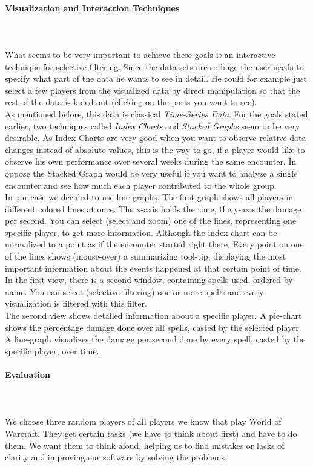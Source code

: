 \documentclass{scrartcl}
\begin{document}
\paragraph{Visualization and Interaction Techniques}
\hfill \\ \hfill \\
What seems to be very important to achieve these goals is an interactive technique for selective filtering. Since the data sets are so huge the user needs to specify what part of the data he wants to see in detail. He could for example just select a few players from the visualized data by direct manipulation so that the rest of the data is faded out (clicking on the parts you want to see).\\
As mentioned before, this data is classical \emph{Time-Series Data}. For the goals stated earlier, two techniques called \emph{Index Charts} and \emph{Stacked Graphs} seem to be very desirable. As Index Charts are very good when you want to observe relative data changes instead of absolute values, this is the way to go, if a player would like to observe his own performance over several weeks during the same encounter. In oppose the Stacked Graph would be very useful if you want to analyze a single encounter and see how much each player contributed to the whole group.\\
In our case we decided to use line graphs. The first graph shows all players in different colored lines at once. The x-axis holds the time, the y-axis the damage per second. You can select (select and zoom) one of the lines, representing one specific player, to get more information. Although the index-chart can be normalized to a point as if the encounter started right there. Every point on one of the lines shows (mouse-over) a summarizing tool-tip, displaying the most important information about the events happened at that certain point of time.\\
In the first view, there is a second window, containing spells used, ordered by name. You can select (selective filtering)  one or more spells and every visualization is filtered with this filter.\\
The second view shows detailed information about a specific player. A pie-chart shows the percentage damage done over all spells, casted by the selected player. A line-graph visualizes the damage per second done by every spell, casted by the specific player, over time.

\paragraph{Evaluation}
\hfill \\ \hfill \\
We choose three random players of all players we know that play World of Warcraft. They get certain tasks (we have to think about first) and have to do them. We want them to think aloud, helping us to find mistakes or lacks of clarity and improving our software by solving the problems.
\end{document}
